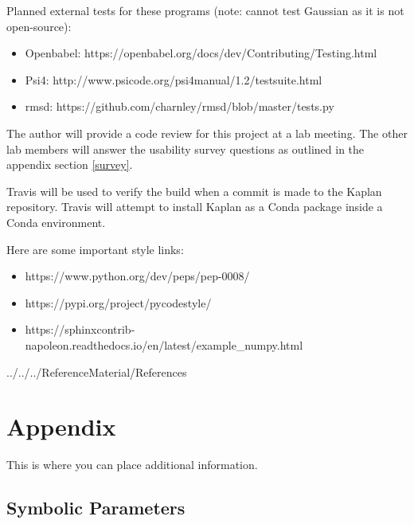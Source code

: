 \documentclass[12pt, titlepage]{article}
\newcommand{\progname}{Kaplan} %
\begin{document}
Planned external tests for these programs (note: cannot test Gaussian as it is 
not open-source):

\begin{itemize}
	\item Openbabel: https://openbabel.org/docs/dev/Contributing/Testing.html
	\item Psi4: http://www.psicode.org/psi4manual/1.2/testsuite.html
	\item rmsd: https://github.com/charnley/rmsd/blob/master/tests.py
\end{itemize}

The author will provide a code review for this project at a lab meeting. The 
other lab members will answer the usability survey questions as outlined in the 
appendix section \ref{survey}.
				
Travis will be used to verify the build when a commit is made to the 
\progname{} repository. Travis will attempt to install \progname{} as a Conda 
package inside a Conda environment. 

Here are some important style links:

\begin{itemize}
	
\item https://www.python.org/dev/peps/pep-0008/
\item https://pypi.org/project/pycodestyle/
\item 
https://sphinxcontrib-napoleon.readthedocs.io/en/latest/example\_numpy.html

\end{itemize}




 {../../../ReferenceMaterial/References}

\newpage

\section{Appendix}

This is where you can place additional information.

\subsection{Symbolic Parameters}
\end{document}
